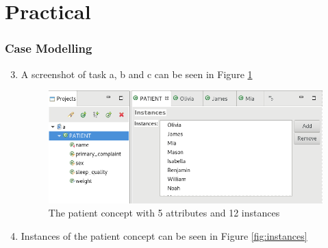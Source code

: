 \documentclass[a4paper]{article}
\begin{document}
\section{Practical}
\subsubsection*{Case Modelling}
    \begin{enumerate}[label=\alph*)]
        \setcounter{enumi}{2}
        \item
            A screenshot of task a, b and c can be seen in Figure
            \ref{fig:patient}
            \begin{figure}[H]
                \centering
                \includegraphics[width=0.7\linewidth]{patient.png}
                \caption{The patient concept with 5 attributes and 12
                instances}
                \label{fig:patient}
            \end{figure}
        \item
            Instances of the patient concept can be seen in Figure
            \ref{fig:instances}


\end{enumerate}
\end{document}
